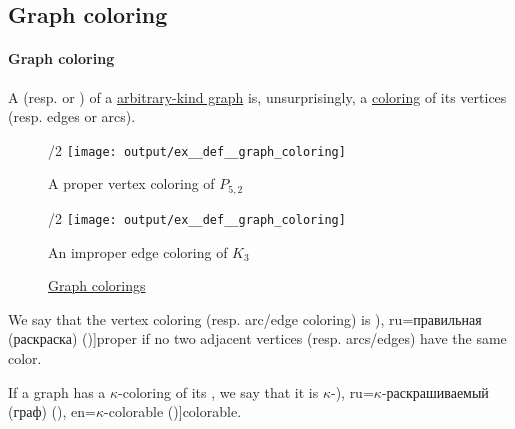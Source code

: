 \subsection{Graph coloring}\label{subsec:graph_coloring}

\paragraph{Graph coloring}

\begin{definition}\label{def:graph_coloring}
  A  (resp.  or ) of a \hyperref[rem:arbitrary_kind_graph]{arbitrary-kind graph} is, unsurprisingly, a \hyperref[def:set_coloring]{coloring} of its vertices (resp. edges or arcs).

  \begin{figure}[!ht]
    \begin{subcaptionblock}{\textwidth/2}
      \centering
      \texttt{[image: output/ex\_\_def\_\_graph\_coloring]}
      \caption{A proper vertex coloring of \hyperref[def:petersen_graph]{\( P_{5,2} \)}}\label{fig:def:graph_coloring/petersen}
    \end{subcaptionblock}
    \hfill
    \begin{subcaptionblock}{\textwidth/2}
      \centering
      \texttt{[image: output/ex\_\_def\_\_graph\_coloring]}
      \caption{An improper edge coloring of \hyperref[def:complete_graph]{\( K_3 \)}}\label{fig:def:graph_coloring/triangle}
    \end{subcaptionblock}
    \caption{\hyperref[def:graph_coloring]{Graph colorings}}\label{fig:def:graph_coloring}
  \end{figure}

  \begin{thmenum}
     We say that the vertex coloring (resp. arc/edge coloring) is \term[bg=правилно (оцветяване) (\cite[141]{Мирчев2001}), ru=правильная (раскраска) (\cite[306]{Емеличев1990})]{proper} if no two adjacent vertices (resp. arcs/edges) have the same color.

     If a graph has a \( \kappa \)-coloring of its , we say that it is \( \kappa \)-\term[bg=\( \kappa \)-оцветим (граф) (\cite[141]{Мирчев2001}), ru=\( \kappa \)-раскрашиваемый (граф) (\cite[\S 53]{Емеличев1990}), en=\( \kappa \)-colorable (\cite[111]{Diestel2005})]{colorable}.
  \end{thmenum}
\end{definition}

